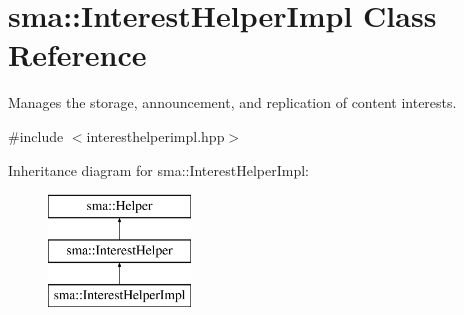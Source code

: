 \hypertarget{classsma_1_1InterestHelperImpl}{\section{sma\-:\-:Interest\-Helper\-Impl Class Reference}
\label{classsma_1_1InterestHelperImpl}
}


Manages the storage, announcement, and replication of content interests.  




{\ttfamily \#include $<$interesthelperimpl.\-hpp$>$}

Inheritance diagram for sma\-:\-:Interest\-Helper\-Impl\-:\begin{figure}[H]
\begin{center}
\leavevmode
\includegraphics[height=3.000000cm]{classsma_1_1InterestHelperImpl}
\end{center}
\end{figure}

